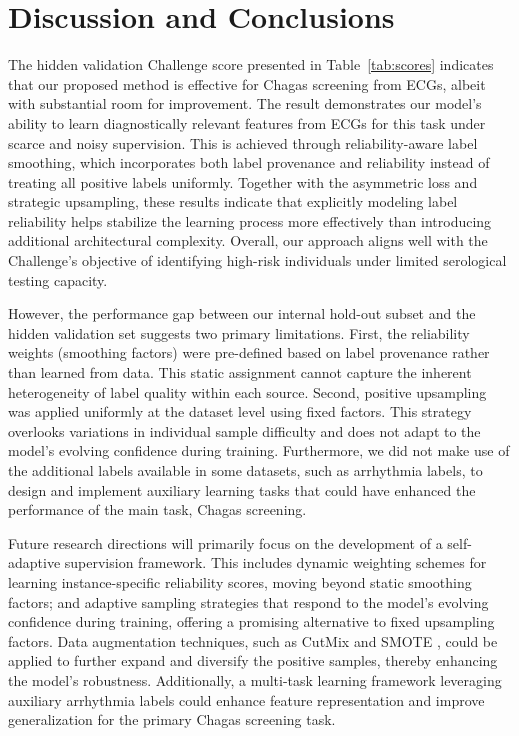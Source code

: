 \section{Discussion and Conclusions}
\label{sec:discu}


The hidden validation Challenge score presented in Table~\ref{tab:scores} indicates that our proposed method is effective for Chagas screening from ECGs, albeit with substantial room for improvement. The result demonstrates our model's ability to learn diagnostically relevant features from ECGs for this task under scarce and noisy supervision. This is achieved through reliability-aware label smoothing, which incorporates both label provenance and reliability instead of treating all positive labels uniformly. Together with the asymmetric loss and strategic upsampling, these results indicate that explicitly modeling label reliability helps stabilize the learning process more effectively than introducing additional architectural complexity. Overall, our approach aligns well with the Challenge's objective of identifying high-risk individuals under limited serological testing capacity.

However, the performance gap between our internal hold-out subset and the hidden validation set suggests two primary limitations. First, the reliability weights (smoothing factors) were pre-defined based on label provenance rather than learned from data. This static assignment cannot capture the inherent heterogeneity of label quality within each source. Second, positive upsampling was applied uniformly at the dataset level using fixed factors. This strategy overlooks variations in individual sample difficulty and does not adapt to the model's evolving confidence during training. Furthermore, we did not make use of the additional labels available in some datasets, such as arrhythmia labels, to design and implement auxiliary learning tasks that could have enhanced the performance of the main task, Chagas screening.

Future research directions will primarily focus on the development of a self-adaptive supervision framework. This includes dynamic weighting schemes for learning instance-specific reliability scores, moving beyond static smoothing factors; and adaptive sampling strategies that respond to the model's evolving confidence during training, offering a promising alternative to fixed upsampling factors. Data augmentation techniques, such as CutMix \cite{yun2019cutmix} and SMOTE \cite{Chawla_2002_SMOTE}, could be applied to further expand and diversify the positive samples, thereby enhancing the model's robustness. Additionally, a multi-task learning framework leveraging auxiliary arrhythmia labels could enhance feature representation and improve generalization for the primary Chagas screening task.
